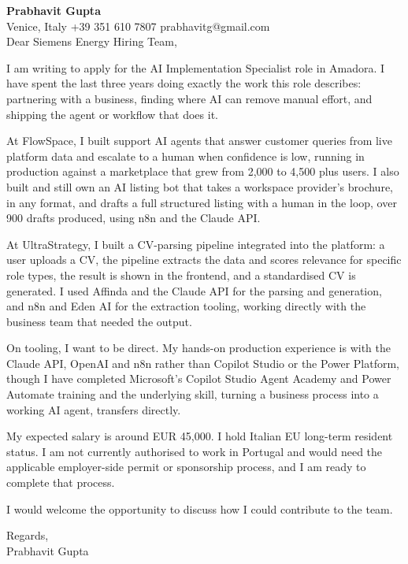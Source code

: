 \documentclass[a4paper,10.5pt]{article}
\begin{document}
\textbf{Prabhavit Gupta}\\
Venice, Italy \textbar{} +39 351 610 7807 \textbar{} prabhavitg@gmail.com\\[10pt]
Dear Siemens Energy Hiring Team,

I am writing to apply for the AI Implementation Specialist role in Amadora. I have spent the last three years doing exactly the work this role describes: partnering with a business, finding where AI can remove manual effort, and shipping the agent or workflow that does it.

At FlowSpace, I built support AI agents that answer customer queries from live platform data and escalate to a human when confidence is low, running in production against a marketplace that grew from 2,000 to 4,500 plus users. I also built and still own an AI listing bot that takes a workspace provider's brochure, in any format, and drafts a full structured listing with a human in the loop, over 900 drafts produced, using n8n and the Claude API.

At UltraStrategy, I built a CV-parsing pipeline integrated into the platform: a user uploads a CV, the pipeline extracts the data and scores relevance for specific role types, the result is shown in the frontend, and a standardised CV is generated. I used Affinda and the Claude API for the parsing and generation, and n8n and Eden AI for the extraction tooling, working directly with the business team that needed the output.

On tooling, I want to be direct. My hands-on production experience is with the Claude API, OpenAI and n8n rather than Copilot Studio or the Power Platform, though I have completed Microsoft's Copilot Studio Agent Academy and Power Automate training and the underlying skill, turning a business process into a working AI agent, transfers directly.

My expected salary is around EUR 45,000. I hold Italian EU long-term resident status. I am not currently authorised to work in Portugal and would need the applicable employer-side permit or sponsorship process, and I am ready to complete that process.

I would welcome the opportunity to discuss how I could contribute to the team.

Regards,\\
Prabhavit Gupta
\end{document}
